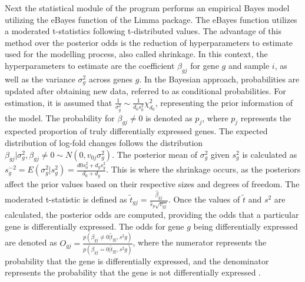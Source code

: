 \documentclass[
  11pt,
]{article}
\begin{document}
Next the statistical module of the program performs an empirical Bayes model utilizing the eBayes \citep{Smyth2004} function of the Limma package. The eBayes function utilizes a moderated t-statistics following t-distributed values. The advantage of this method over the posterior odds is the reduction of hyperparameters to estimate used for the modelling process, also called shrinkage.
In this context, the hyperparameters to estimate are the coefficient \(\beta_{gj}\) for gene \(g\) and sample \(i\), as well as the variance \(\sigma^2_g\) across genes \(g\). In the Bayesian approach, probabilities are updated after obtaining new data, referred to as conditional probabilities. For estimation, it is assumed that \(\frac{1}{\sigma^2_g} \sim \frac{1}{d_{0}s^2_{0}} \chi^2_{d_{0}}\), representing the prior information of the model.
The probability for \(\beta_{gj} \neq 0\) is denoted as \(p_j\), where \(p_j\) represents the expected proportion of truly differentially expressed genes. The expected distribution of log-fold changes follows the distribution \(\beta_{gj} | \sigma^2_g , \beta_{gj} \neq 0 \sim N(0, v_{0j}\sigma^2_g)\).
The posterior mean of \(\sigma^2_g\) given \(s^2_g\) is calculated as \(s^{-2}_g = E(\sigma^2_g | s^2_g) = \frac{d{0}s^2_{0} + d_{g}s^2_{g}}{d_{0} + d_{g}}\). This is where the shrinkage occurs, as the posteriors affect the prior values based on their respective sizes and degrees of freedom.
The moderated t-statistic is defined as \(\tilde{t}_{gj} = \frac{\hat{\beta}_{gj}}{\hat{s}_{g}\sqrt{v_{gj}}}\). Once the values of \(\tilde{t}\) and \(s^{2}\) are calculated, the posterior odds are computed, providing the odds that a particular gene is differentially expressed. The odds for gene \(g\) being differentially expressed are denoted as \(O_{gj} = \frac{p(\beta_{gj} \neq 0 | \tilde{t}_{gj}, s^2{g})}{p(\beta_{gj} = 0 | \tilde{t}_{gj}, s^2{g})}\), where the numerator represents the probability that the gene is differentially expressed, and the denominator represents the probability that the gene is not differentially expressed \citep{Smyth2004}.
\end{document}
